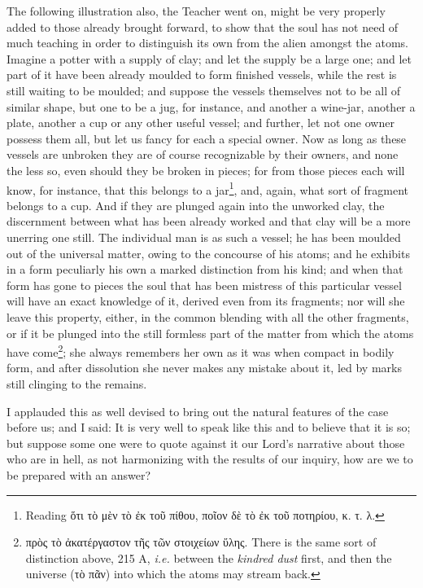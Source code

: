 The following illustration also, the Teacher went on, might be very properly added to those already brought forward, to show that the soul has not need of much teaching in order to distinguish its own from the alien amongst the atoms. Imagine a potter with a supply of clay; and let the supply be a large one; and let part of it have been already moulded to form finished vessels, while the rest is still waiting to be moulded; and suppose the vessels themselves not to be all of similar shape, but one to be a jug, for instance, and another a wine-jar, another a plate, another a cup or any other useful vessel; and further, let not one owner possess them all, but let us fancy for each a special owner. Now as long as these vessels are unbroken they are of course recognizable by their owners, and none the less so, even should they be broken in pieces; for from those pieces each will know, for instance, that this belongs to a jar\footnote{Reading \textgreek{ὅτι τὸ μὲν τὸ ἐκ τοῦ πίθου, ποῖον δὲ τὸ ἐκ τοῦ ποτηρίου, κ. τ. λ}.}, and, again, what sort of fragment belongs to a cup. And if they are plunged again into the unworked clay, the discernment between what has been already worked and that clay will be a more unerring one still. The individual man is as such a vessel; he has been moulded out of the universal matter, owing to the concourse of his atoms; and he exhibits in a form peculiarly his own a marked distinction from his kind; and when that form has gone to pieces the soul that has been mistress of this particular vessel will have an exact knowledge of it, derived even from its fragments; nor will she leave this property, either, in the common blending with all the other fragments, or if it be plunged into the still formless part of the matter from which the atoms have come\footnote{\textgreek{πρὸς τὸ ἀκατέργαστον τῆς τῶν στοιχείων ὕλης}. There is the same sort of distinction above, 215 A, \emph{i.e.} between the \emph{kindred dust} first, and then the universe (\textgreek{τὸ πᾶν}) into which the atoms may stream back.}; she always remembers her own as it was when compact in bodily form, and after dissolution she never makes any mistake about it, led by marks still clinging to the remains.

I applauded this as well devised to bring out the natural features of the case before us; and I said: It is very well to speak like this and to believe that it is so; but suppose some one were to quote against it our Lord’s narrative about those who are in hell, as not harmonizing with the results of our inquiry, how are we to be prepared with an answer?

